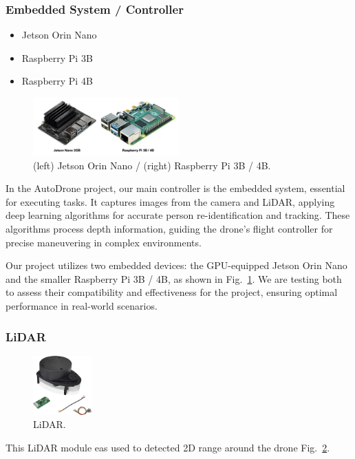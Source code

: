     \subsubsection{Embedded System / Controller}\label{subsection:A4}
    \begin{itemize}
        \item Jetson Orin Nano
        \item Raspberry Pi 3B
        \item Raspberry Pi 4B
    \end{itemize}

     \begin{figure}[H]
        \centerline{\includegraphics[width=0.5\textwidth]{Figures/Methods/Embedded_Systems.png}}
        \caption{(left) Jetson Orin Nano / (right) Raspberry Pi 3B / 4B.}
        \label{fig2a4}
    \end{figure}

    In the AutoDrone project, our main controller is the embedded system, essential for executing tasks. It captures images from the camera and LiDAR, applying deep learning algorithms for accurate person re-identification and tracking. These algorithms process depth information, guiding the drone's flight controller for precise maneuvering in complex environments.
    
    Our project utilizes two embedded devices: the GPU-equipped Jetson Orin Nano and the smaller Raspberry Pi 3B / 4B, as shown in Fig.~\ref{fig2a4}. We are testing both to assess their compatibility and effectiveness for the project, ensuring optimal performance in real-world scenarios.

    \subsubsection{LiDAR}\label{subsection:A5}
     \begin{figure}[H]
        \centerline{\includegraphics[width=0.2\textwidth]{Figures/Methods/LiDAR.jpg}}
        \caption{LiDAR.}
        \label{fig2a5}
    \end{figure}
    This LiDAR module eas used to detected 2D range around the drone Fig.~\ref{fig2a5}.